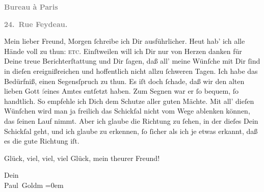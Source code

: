 \pstart
           \begin{otherlanguage}{french}\textcolor{gray}{\textbf{\textbf{Bureau à Paris}}}\end{otherlanguage}\pend
           
\pstart
           \begin{otherlanguage}{french}\textcolor{gray}{\textbf{\textbf{24. Rue Feydeau.}}}\end{otherlanguage}\pend
           
\pstart\center{}Mein lieber Freund,\pend\vspace{0.5em}
\pstart
           Morgen ſchreibe ich Dir ausführlicher. Heut hab’ ich alle Hände voll zu thun: \label{K_L02749-1v}\label{K_L02749-1}{ }\textsc{etc}. Einſtweilen will ich Dir nur von Herzen danken für
               Deine treue Berichterſtattung und Dir ſagen, daß 
               all’ meine Wünſche mit Dir ſind in dieſen {\pb}ereignißreichen und hoffentlich nicht allzu ſchweren Tagen. Ich habe das Bedürfniß,
               einen Segensſpruch zu thun. Es iſt doch ſchade, daß \strikeout{\textcolor{gray}{n}} wir den alten lieben Gott \textcolor{gray}{ſ}eines  Amtes entſetzt haben. Zum Segnen war er ſo bequem, ſo handtlich. So
               empfehle ich Dich dem Schutze aller guten Mächte. Mit all’ dieſen Wünſchen wird man
               ja freilich {\pb}das Schickſal nicht vom Wege ablenken
               können, das ſeinen Lauf nimmt. Aber ich glaube die Richtung zu ſehen, in der dieſes
               Dein Schickſal geht, und ich glaube zu erkennen, ſo ſicher als ich je etwas erkannt,
               daß es die gute Richtung iſt.\pend
           
\pstart
           Glück, viel, viel, viel Glück, mein theurer Freund!\pend
           
\pstart
           Dein {\\[\baselineskip]}\spacefill\mbox{Paul Goldm\textcolor{gray}{{\geminationn}}}\pend
           \leftskip=0em{}\endnumbering{}  
      